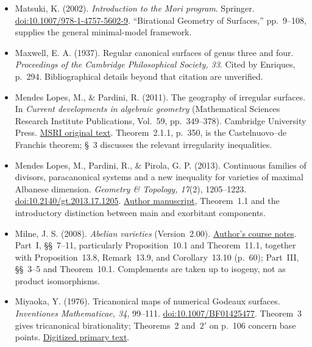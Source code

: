 \begin{sloppypar}
\begin{itemize}
\item Matsuki, K. (2002). \emph{Introduction to the Mori program}. Springer. \href{https://doi.org/10.1007/978-1-4757-5602-9}{doi:10.1007/978-1-4757-5602-9}. ``Birational Geometry of Surfaces,'' pp.~9--108, supplies the general minimal-model framework.

\item Maxwell, E. A. (1937). Regular canonical surfaces of genus three and four. \emph{Proceedings of the Cambridge Philosophical Society, 33}. Cited by Enriques, p.~294. Bibliographical details beyond that citation are unverified.

\item Mendes Lopes, M., \& Pardini, R. (2011). The geography of irregular surfaces. In \emph{Current developments in algebraic geometry} (Mathematical Sciences Research Institute Publications, Vol.~59, pp.~349--378). Cambridge University Press. \href{https://library.slmath.org/books/Book59/files/66pardini.pdf}{MSRI original text}. Theorem~2.1.1, p.~350, is the Castelnuovo--de Franchis theorem; \S~3 discusses the relevant irregularity inequalities.

\item Mendes Lopes, M., Pardini, R., \& Pirola, G. P. (2013). Continuous families of divisors, paracanonical systems and a new inequality for varieties of maximal Albanese dimension. \emph{Geometry \& Topology, 17}(2), 1205--1223. \href{https://doi.org/10.2140/gt.2013.17.1205}{doi:10.2140/gt.2013.17.1205}. \href{https://arxiv.org/abs/1207.4516}{Author manuscript}, Theorem~1.1 and the introductory distinction between main and exorbitant components.

\item Milne, J. S. (2008). \emph{Abelian varieties} (Version~2.00). \href{https://www.jmilne.org/math/CourseNotes/AV.pdf}{Author's course notes}. Part~I, \S\S~7--11, particularly Proposition~10.1 and Theorem~11.1, together with Proposition~13.8, Remark~13.9, and Corollary~13.10 (p.~60); Part~III, \S\S~3--5 and Theorem~10.1. Complements are taken up to isogeny, not as product isomorphisms.

\item Miyaoka, Y. (1976). Tricanonical maps of numerical Godeaux surfaces. \emph{Inventiones Mathematicae, 34}, 99--111. \href{https://doi.org/10.1007/BF01425477}{doi:10.1007/BF01425477}. Theorem~3 gives tricanonical birationality; Theorems~2 and~$2'$ on p.~106 concern base points. \href{https://www.digizeitschriften.de/download/pdf/356556735_0034/log12.pdf}{Digitized primary text}.


\end{itemize}
\end{sloppypar}
